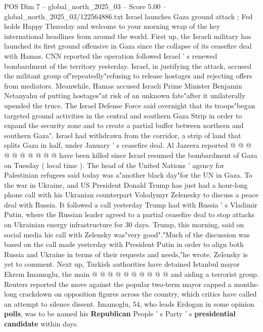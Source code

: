 \begin{textsample}{POS Dim 7 – global\_north\_2025\_03 – Score 5.00 – global\_north\_2025\_03/122564886.txt}  \label{ex:f7_pos_325}
Israel launches Gaza ground attack ; Fed holds Happy Thursday and welcome to your morning wrap of the key international headlines from around the world.
First up, the Israeli military has launched its first ground offensive in Gaza since the collapse of its ceasefire deal with Hamas.
CNN reported the operation followed Israel ' s renewed bombardment of the territory yesterday.
Israel, in justifying the attack, accused the militant group of"repeatedly"refusing to release hostages and rejecting offers from mediators.
Meanwhile, Hamas accused Israeli Prime Minister Benjamin Netanyahu of putting hostages"at risk of an unknown fate"after it unilaterally upended the truce.
The Israel Defense Force said overnight that its troops"began targeted ground activities in the central and southern Gaza Strip in order to expand the security zone and to create a partial buffer between northern and southern Gaza".
Israel had withdrawn from the corridor, a strip of land that splits Gaza in half, under January ' s ceasefire deal.
Al Jazeera reported @ @ @ @ @ @ @ @ @ @ have been killed since Israel resumed the bombardment of Gaza on Tuesday ( local time ).
The head of the United Nations ' agency for Palestinian refugees said today was a"another black day"for the UN in Gaza.
To the war in Ukraine, and US President Donald Trump has just had a hour-long phone call with his Ukranian counterpart Volodymyr Zelenesky to discuss a peace deal with Russia.
It followed a call yesterday Trump had with Russia ' s Vladimir Putin, where the Russian leader agreed to a partial ceasefire deal to stop attacks on Ukrainian energy infrastructure for 30 days.
Trump, this morning, said on social media his call with Zelensky was"very good"."Much of the discussion was based on the call made yesterday with President Putin in order to align both Russia and Ukraine in terms of their requests and needs,"he wrote.
Zelensky is yet to comment.
Next up, Turkish authorities have detained Istanbul mayor Ekrem Imamoglu, the main @ @ @ @ @ @ @ @ @ @ and aiding a terrorist group.
Reuters reported the move against the popular two-term mayor capped a months-long crackdown on opposition figures across the country, which critics have called an attempt to silence dissent.
Imamoglu, 54, who leads Erdogan in some opinion \textbf{polls}, was to be named his \textbf{Republican} People ' s Party ' s \textbf{presidential} \textbf{candidate} within days.

\end{textsample}
